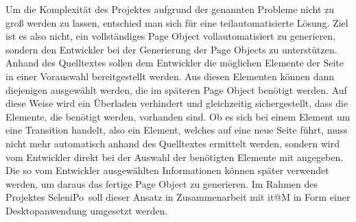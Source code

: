 Um die Komplexität des Projektes aufgrund der genannten Probleme nicht zu groß werden zu lassen, entschied man sich für eine teilautomatisierte Lösung.
Ziel ist es also nicht, ein vollständiges Page Object vollautomatisiert zu generieren, sondern den Entwickler bei der Generierung der Page Objects zu unterstützen. Anhand des Quelltextes sollen dem Entwickler die möglichen Elemente der Seite in einer Vorauswahl bereitgestellt werden. Aus diesen Elementen können dann diejenigen ausgewählt werden, die im späteren Page Object benötigt werden. Auf diese Weise wird ein Überladen verhindert und gleichzeitig sichergestellt, dass die Elemente, die benötigt werden, vorhanden sind.
Ob es sich bei einem Element um eine Transition handelt, also ein Element, welches auf eine neue Seite führt, muss nicht mehr automatisch anhand des Quelltextes ermittelt werden, sondern wird vom Entwickler direkt bei der Auswahl der benötigten Elemente mit angegeben.
Die so vom Entwickler ausgewählten Informationen können später verwendet werden, um daraus das fertige Page Object zu generieren.
Im Rahmen des Projektes \grq SeleniPo\grq\ soll dieser Ansatz in Zusammenarbeit mit it@M in Form einer Desktopanwendung umgesetzt werden. 

